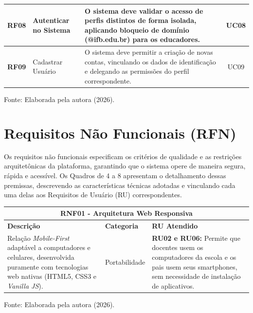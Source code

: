 \begin{quadro}[H]
\begin{tabular}{|c|p{4cm}|p{7.5cm}|c|}
        \textbf{RF08} & Autenticar no Sistema & O sistema deve validar o acesso de perfis distintos de forma isolada, aplicando bloqueio de domínio (@ifb.edu.br) para os educadores. & UC08 \\ \hline
        
        \textbf{RF09} & Cadastrar Usuário & O sistema deve permitir a criação de novas contas, vinculando os dados de identificação e delegando as permissões do perfil correspondente. & UC09 \\ \hline
    \end{tabular}
    
    \vspace{0.1cm}
    \begin{flushleft}
        \footnotesize Fonte: Elaborada pela autora (2026).
    \end{flushleft}
\end{quadro}

\vspace{0.1cm}
\section{Requisitos Não Funcionais (RFN)}

Os requisitos não funcionais especificam os critérios de qualidade e as restrições arquitetônicas da plataforma, garantindo que o sistema opere de maneira segura, rápida e acessível. Os Quadros de 4 a 8 apresentam o detalhamento dessas premissas, descrevendo as características técnicas adotadas e vinculando cada uma delas aos Requisitos de Usuário (RU) correspondentes.

\begin{quadro}[H]
    \centering
    \caption{RNF01: Arquitetura Web Responsiva}
    \label{quadro:rnf01}
    \renewcommand{\arraystretch}{1.5}
    \begin{tabular}{|p{5.5cm}|p{2.5cm}|p{7cm}|}
        \hline
        \multicolumn{3}{|c|}{\textbf{RNF01 - Arquitetura Web Responsiva}} \\ \hline
        \textbf{Descrição} & \textbf{Categoria} & \textbf{RU Atendido} \\ \hline
        Relação \textit{Mobile-First} adaptável a computadores e celulares, desenvolvida puramente com tecnologias web nativas (HTML5, CSS3 e \textit{Vanilla JS}). & Portabilidade & \textbf{RU02 e RU06:} Permite que docentes usem os computadores da escola e os pais usem seus smartphones, sem necessidade de instalação de aplicativos. \\ \hline
    \end{tabular}
    
    \vspace{0.1cm}
    \begin{flushleft}
        \footnotesize Fonte: Elaborada pela autora (2026).
    \end{flushleft}
\end{quadro}

